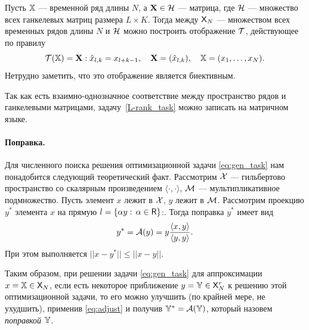 \documentclass[12pt,a4paper,fleqn,leqno]{article}
\begin{document}
Пусть $\mathbb{X}$ --- временной ряд длины $N$, а $\mathbf{X} \in \mathcal{H}$ --- матрица, где $\mathcal{H}$ --- множество всех ганкелевых матриц размера $L \times K$. Тогда между $\mathsf{X}_N$ --- множеством всех временных рядов длины $N$ и $\mathcal{H}$ можно построить отображение $\mathcal{T}$, действующее по правилу
\begin{equation*}
\mathcal{T}(\mathbb{X}) = \mathbf{X}: \hat x_{l, k} = x_{l + k - 1}, \quad \mathbf{X} = (\hat x_{l,k}), \quad \mathbb{X} = (x_1, \ldots, x_N).
\end{equation*}
Нетрудно заметить, что это отображение является биективным.

Так как есть взаимно-однозначное соответствие между пространство рядов и ганкелевыми матрицами,
задачу~\eqref{L-rank_task} можно записать на матричном языке.

\paragraph{Поправка.} Для численного поиска решения оптимизационной задачи \eqref{eq:gen_task} нам понадобится следующий теоретический факт.
Рассмотрим $\mathcal{X}$ --- гильбертово пространство со скалярным произведением $\langle\cdot, \cdot\rangle$, $\mathcal{M}$ --- мультипликативное подмножество. Пусть элемент $x$ лежит в $\mathcal{X}$, $y$ лежит в $\mathcal{M}$. Рассмотрим проекцию $y^*$ элемента $x$ на прямую $l = \{\alpha y:\, \alpha \in \mathsf{R}\}$:. Тогда поправка $y^*$ имеет вид
\begin{equation}
\label{eq:adjust}
y^* = \mathcal{A}(y)= y \frac{\langle x, y\rangle}{\langle y, y\rangle}.
\end{equation}
При этом выполняется $||x - y^*|| \le ||x - y||$.

Таким образом, при решении задачи \eqref{eq:gen_task} для аппроксимации $x=\mathbb{X} \in \mathsf{X}_N$, если есть некоторое приближение $y=\mathbb{Y} \in \mathsf{X}_N^r$ к решению этой оптимизационной задачи, то его можно улучшить (по крайней мере, не ухудшить), применив \eqref{eq:adjust} и получив $\mathbb{Y}^*=\mathcal{A}(\mathbb{Y})$, который назовем \emph{поправкой $\mathbb{Y}$}.

\end{document}
